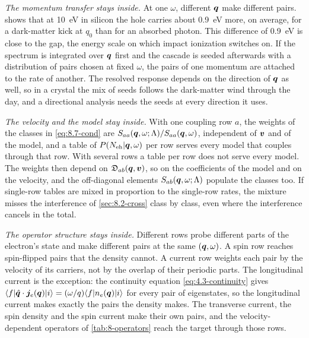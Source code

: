 \emph{The momentum transfer stays inside.} At one $\omega$, different $\bm{q}$ make different pairs.  shows that at \SI{10}{eV} in silicon the hole carries about \SI{0.9}{eV} more, on average, for a dark-matter kick at $q_0$ than for an absorbed photon. This difference of \SI{0.9}{eV} is close to the gap, the energy scale on which impact ionization switches on. If the spectrum is integrated over $\bm{q}$ first and the cascade is seeded afterwards with a distribution of pairs chosen at fixed $\omega$, the pairs of one momentum are attached to the rate of another. The resolved response depends on the direction of $\bm{q}$ as well, so in a crystal the mix of seeds follows the dark-matter wind through the day, and a directional analysis needs the seeds at every direction it uses.

\emph{The velocity and the model stay inside.} With one coupling row $a$, the weights of the classes in \cref{eq:8.7-cond} are $S_{aa}(\bm{q},\omega;\Lambda)/S_{aa}(\bm{q},\omega)$, independent of $\bm{v}$ and of the model, and a table of $P(N_{\mathrm{eh}}|\bm{q},\omega)$ per row serves every model that couples through that row. With several rows a table per row does not serve every model. The weights then depend on $\mathfrak{D}_{ab}(\bm{q},\bm{v})$, so on the coefficients of the model and on the velocity, and the off-diagonal elements $S_{ab}(\bm{q},\omega;\Lambda)$ populate the classes too. If single-row tables are mixed in proportion to the single-row rates, the mixture misses the interference of \cref{sec:8.2-cross} class by class, even where the interference cancels in the total.

\emph{The operator structure stays inside.} Different rows probe different parts of the electron's state and make different pairs at the same $(\bm{q},\omega)$. A spin row reaches spin-flipped pairs that the density cannot. A current row weights each pair by the velocity of its carriers, not by the overlap of their periodic parts. The longitudinal current is the exception: the continuity equation \cref{eq:4.3-continuity} gives $\langle f|\hat{\bm{q}}\cdot\bm{j}_e(\bm{q})|i\rangle = (\omega/q)\langle f|n_e(\bm{q})|i\rangle$ for every pair of eigenstates, so the longitudinal current makes exactly the pairs the density makes. The transverse current, the spin density and the spin current make their own pairs, and the velocity-dependent operators of \cref{tab:8-operators} reach the target through those rows.


